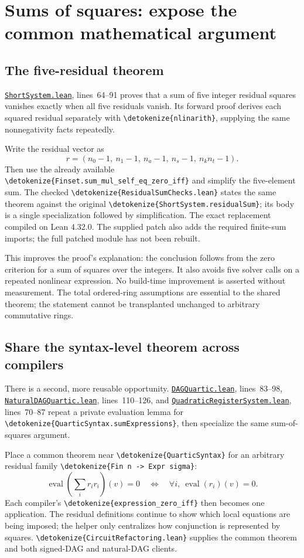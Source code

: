 \documentclass[11pt,letterpaper]{article}
\newcommand{\code}[1]{\expandafter\nolinkurl\expandafter{\detokenize{#1}}}
\newcommand{\repo}{https://github.com/VladimirReshetnikov/ProveIt/blob/60e9c5d620c6c387d932876cfa2d9376f64ea56c}
\newcommand{\src}[2]{\href{\repo/Computability/DiophantineConsistency/Lean/DiophantineConsistency/#1.lean}{\nolinkurl{#1.lean}}, lines~#2}
\begin{document}
\section{Sums of squares: expose the common mathematical argument}

\subsection{The five-residual theorem}

\src{ShortSystem}{64--91} proves that a sum of five integer residual squares vanishes exactly when all five residuals vanish. Its forward proof derives each squared residual separately with \code{nlinarith}, supplying the same nonnegativity facts repeatedly.

Write the residual vector as
\[
r=(n_0-1,\ n_1-1,\ n_a-1,\ n_s-1,\ n_k n_t-1).
\]
Then use the already available \code{Finset.sum_mul_self_eq_zero_iff} and simplify the five-element sum. The checked \code{ResidualSumChecks.lean} states the same theorem against the original \code{ShortSystem.residualSum}; its body is a single specialization followed by simplification. The exact replacement compiled on Lean 4.32.0. The supplied patch also adds the required finite-sum imports; the full patched module has not been rebuilt.

This improves the proof's explanation: the conclusion follows from the zero criterion for a sum of squares over the integers. It also avoids five solver calls on a repeated nonlinear expression. No build-time improvement is asserted without measurement. The total ordered-ring assumptions are essential to the shared theorem; the statement cannot be transplanted unchanged to arbitrary commutative rings.

\subsection{Share the syntax-level theorem across compilers}

There is a second, more reusable opportunity. \src{DAGQuartic}{83--98}, \src{NaturalDAGQuartic}{110--126}, and \src{QuadraticRegisterSystem}{70--87} repeat a private evaluation lemma for \code{QuarticSyntax.sumExpressions}, then specialize the same sum-of-squares argument.

Place a common theorem near \code{QuarticSyntax} for an arbitrary residual family \code{Fin n -> Expr sigma}:
\[
\operatorname{eval}\!\left(\sum_i r_i r_i\right)(v)=0
\quad\Longleftrightarrow\quad
\forall i,\ \operatorname{eval}(r_i)(v)=0.
\]
Each compiler's \code{expression_zero_iff} then becomes one application. The residual definitions continue to show which local equations are being imposed; the helper only centralizes how conjunction is represented by squares. \code{CircuitRefactoring.lean} supplies the common theorem and both signed-DAG and natural-DAG clients.
\end{document}
